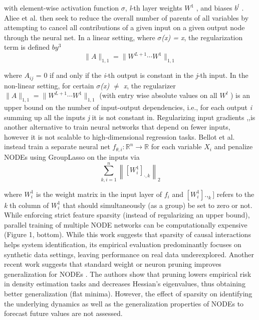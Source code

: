 \documentclass{article}
\begin{document}
    with element-wise activation function $\sigma$, \textit{l}-th layer weights $W^{1}$
    , and biases $b^{l}$
    . Aliee et al. \cite{Bolstad_2011} then
    seek to reduce the overall number of parents of all variables by attempting to cancel all contributions
    of a given input on a given output node through the neural net. In a linear setting, where $\sigma$\textit{(x) = x},
    the regularization term is defined $by^{3}$ \\
    
     \[
    \|A\|_{1,1} = \|W^{L+1} \cdots W^{1}\|_{1,1} \tag{2}
    \]


    where $A_{ij}$ = 0 if and only if the \textit{i}-th output is constant in the \textit{j}-th input. In the non-linear setting,
    for certain $\sigma$\textit{(x) $\neq $ x}, the regularizer $\|A\|_{1,1} = \|W^{L+1} \cdots W^{1}\|_{1,1}$ (with entry wise absolute
    values on all $W^{l}$
    ) is an upper bound on the number of input-output dependencies, i.e., for each
    output \textit{i} summing up all the inputs \textit{j} it is not constant in. Regularizing input gradients \cite{maddison2017the},\cite{kelly2020easynode},\cite{Hasani_Lechner_Amini_Rus_Grosu_2021}is
    another alternative to train neural networks that depend on fewer inputs, however it is not scalable to
    high-dimensional regression tasks.
    Bellot et al. \cite{NIPS2017_9ef2ed4b} instead train a separate neural net $f_{\theta, i}: \mathbb{R}^n \rightarrow \mathbb{R}$
     for each variable \textit{$X_{i}$} and penalize
    NODEs using GroupLasso on the inputs via
    \[
    \sum_{k,i=1}^{n} \left\|\left[W_i^1\right]_{\cdot,k}\right\|_2 \tag{3} 
    \]

    where $W^{1}_{i}$
    is the weight matrix in the input layer of $f_{i}$ and $[W^{1}_{i}].,_{k}]
    $ refers to the \textit{k}
    th column of
   $ W^{1}_{i}$
    that should simultaneously (as a group) be set to zero or not. While enforcing strict feature
    sparsity (instead of regularizing an upper bound), parallel training of multiple NODE networks can
    be computationally expensive (Figure 1, bottom). While this work suggests that sparsity of causal
    interactions helps system identification, its empirical evaluation predominantly focuses on synthetic
    data settings, leaving performance on real data underexplored.
    Another recent work suggests that standard weight or neuron pruning improves generalization for
    NODEs \cite{Liu2022}. The authors show that pruning lowers empirical risk in density estimation tasks and
    decreases Hessian’s eigenvalues, thus obtaining better generalization (flat minima). However, the
    effect of sparsity on identifying the underlying dynamics as well as the generalization properties of
    NODEs to forecast future values are not assessed.
\end{document}
